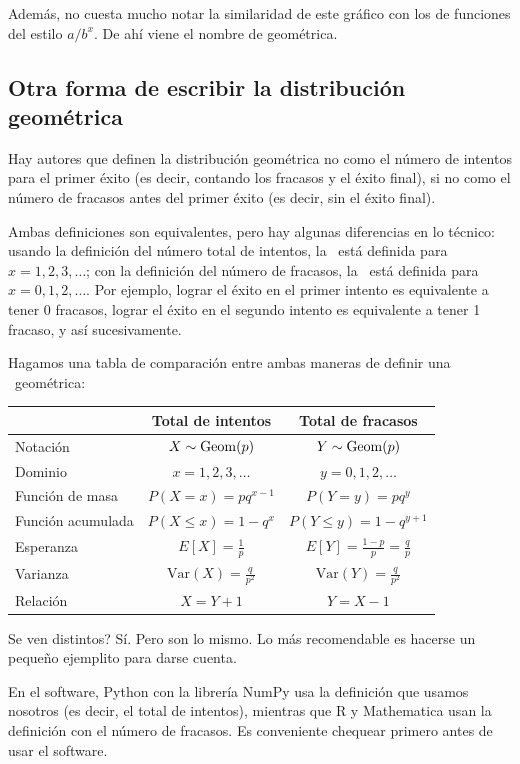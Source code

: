 Además, no cuesta mucho notar la similaridad de este gráfico con los de funciones del estilo \(a/b^x\). De ahí viene el nombre de geométrica.

\subsection{Otra forma de escribir la distribución geométrica}

Hay autores que definen la distribución geométrica no como el número de intentos para el primer éxito (es decir, contando los fracasos y el éxito final), si no como el número de fracasos antes del primer éxito (es decir, sin el éxito final). 

Ambas definiciones son equivalentes, pero hay algunas diferencias en lo técnico: usando la definición del número total de intentos, la \va\ está definida para \(x=1, 2, 3,\ldots\); con la definición del número de fracasos, la \va\ está definida para \(x=0, 1, 2, \ldots\). Por ejemplo, lograr el éxito en el primer intento es equivalente a tener 0 fracasos, lograr el éxito en el segundo intento es equivalente a tener 1 fracaso, y así sucesivamente.

Hagamos una tabla de comparación entre ambas maneras de definir una \va\ geométrica:



\begin{tabular}{lcc}
\toprule
& {Total de intentos} & {Total de fracasos} \\
\midrule
Notación & $X \sim \operatorname{Geom}(p)$ & $Y \sim \operatorname{Geom}(p)$ \\
Dominio & $x = 1, 2, 3, \ldots$ & $y = 0, 1, 2, \ldots$ \\
Función de masa & $P(X=x) = pq^{x-1}$ & $P(Y=y) = pq^y$ \\
Función acumulada & $P(X \leq x) = 1 - q^{x}$ & $P(Y \leq y) = 1 - q^{y+1}$ \\
Esperanza & $E[X] = \frac{1}{p}$ & $E[Y] = \frac{1-p}{p} = \frac{q}{p}$ \\
Varianza & $\text{Var}(X) = \frac{q}{p^2}$ & $\text{Var}(Y) = \frac{q}{p^2}$ \\
Relación & $X = Y + 1$ & $Y = X - 1$ \\
\bottomrule
\end{tabular}

Se ven distintos? Sí. Pero son lo mismo. Lo más recomendable es hacerse un pequeño ejemplito para darse cuenta.

En el software, Python con la librería NumPy usa la definición que usamos nosotros (es decir, el total de intentos), mientras que R y Mathematica usan la definición con el número de fracasos. Es conveniente chequear primero antes de usar el software.

